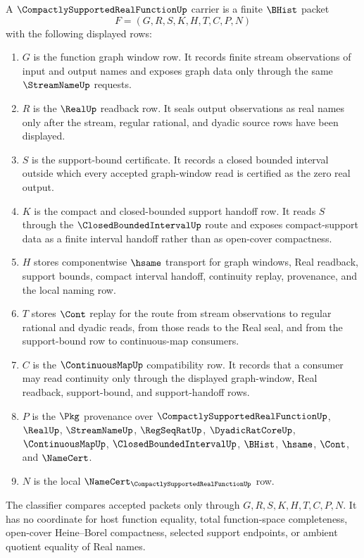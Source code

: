 \begin{definition}
\label{def:compactly-supported-real-function-carrier}
A $\CompactlySupportedRealFunctionUp$ carrier is a finite $\BHist$ packet
$$
F=(G,R,S,K,H,T,C,P,N)
$$
with the following displayed rows:
\begin{enumerate}
\item $G$ is the function graph window row. It records finite stream observations of input and output names and exposes graph data only through the same $\StreamNameUp$ requests.
\item $R$ is the $\RealUp$ readback row. It seals output observations as real names only after the stream, regular rational, and dyadic source rows have been displayed.
\item $S$ is the support-bound certificate. It records a closed bounded interval outside which every accepted graph-window read is certified as the zero real output.
\item $K$ is the compact and closed-bounded support handoff row. It reads $S$ through the $\ClosedBoundedIntervalUp$ route and exposes compact-support data as a finite interval handoff rather than as open-cover compactness.
\item $H$ stores componentwise $\hsame$ transport for graph windows, Real readback, support bounds, compact interval handoff, continuity replay, provenance, and the local naming row.
\item $T$ stores $\Cont$ replay for the route from stream observations to regular rational and dyadic reads, from those reads to the Real seal, and from the support-bound row to continuous-map consumers.
\item $C$ is the $\ContinuousMapUp$ compatibility row. It records that a consumer may read continuity only through the displayed graph-window, Real readback, support-bound, and support-handoff rows.
\item $P$ is the $\Pkg$ provenance over $\CompactlySupportedRealFunctionUp$, $\RealUp$, $\StreamNameUp$, $\RegSeqRatUp$, $\DyadicRatCoreUp$, $\ContinuousMapUp$, $\ClosedBoundedIntervalUp$, $\BHist$, $\hsame$, $\Cont$, and $\NameCert$.
\item $N$ is the local $\NameCert_{\CompactlySupportedRealFunctionUp}$ row.
\end{enumerate}
The classifier compares accepted packets only through $G,R,S,K,H,T,C,P,N$. It has no coordinate for host function equality, total function-space completeness, open-cover Heine--Borel compactness, selected support endpoints, or ambient quotient equality of Real names.
\end{definition}

